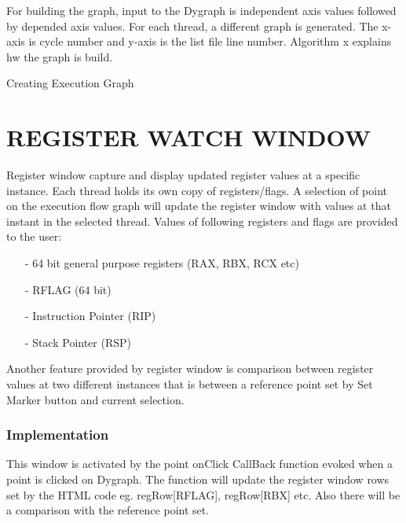 For building the graph, input to the Dygraph is independent axis values followed by depended axis values. For each thread, a different graph is generated. The x-axis is cycle number and y-axis is the list file line number. Algorithm x explains hw the graph is build.

\IncMargin{1em}
\begin{algorithm}[H]
\DontPrintSemicolon
{} 
\KwFn{}
\BlankLine
{}
\caption{Creating Execution Graph}
\end{algorithm}\DecMargin{1em}

\section {REGISTER WATCH WINDOW}

Register window capture and display updated register values at a specific instance. Each thread holds its own copy of registers/flags. A selection of point on the execution flow graph will update the register window with values at that instant in the selected thread. Values of following registers and flags are provided to the user:
\begin{itemize}
	\item[-] 64 bit general purpose registers (RAX, RBX, RCX etc)
	\item[-] RFLAG (64 bit)
	\item[-] Instruction Pointer (RIP)
	\item[-] Stack Pointer (RSP)
\end{itemize}

Another feature provided by register window is comparison between register values at two different instances that is between a reference point set by Set Marker button and current selection. 

\subsubsection{Implementation}

This window is activated by the point onClick CallBack function evoked when a point is clicked on Dygraph. The function will update the register window rows set by the HTML code eg. regRow[RFLAG], regRow[RBX] etc. Also there will be a comparison with the reference point set. 

